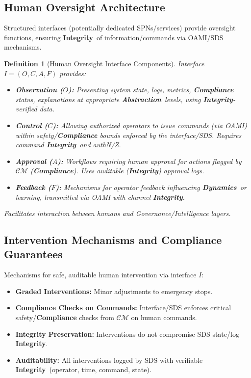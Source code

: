 \documentclass[12pt,a4paper]{report}
\newtheorem{definition}{Definition}[section]
\newcommand{\Integrity}{\textbf{Integrity}}
\newcommand{\Abstraction}{\textbf{Abstraction}}
\newcommand{\Dynamics}{\textbf{Dynamics}}
\begin{document}
	\subsection{Human Oversight Architecture} %
	\label{sec:5-7-1} %
	
	Structured interfaces (potentially dedicated SPNs/services) provide oversight functions, ensuring \Integrity\ of information/commands via OAMI/SDS mechanisms.
	
	\begin{definition}[Human Oversight Interface Components]
		\label{def:oversight-interface-compliance}
		Interface $I = (O, C, A, F)$ provides:
		\begin{itemize}[noitemsep]
			\item \textbf{Observation ($O$):} Presenting system state, logs, metrics, \textbf{Compliance} status, explanations at appropriate \Abstraction\ levels, using \Integrity-verified data.
			\item \textbf{Control ($C$):} Allowing authorized operators to issue commands (via OAMI) within safety/\textbf{Compliance} bounds enforced by the interface/SDS. Requires command \Integrity\ and authN/Z.
			\item \textbf{Approval ($A$):} Workflows requiring human approval for actions flagged by $\mathcal{CM}$ (\textbf{Compliance}). Uses auditable (\Integrity) approval logs.
			\item \textbf{Feedback ($F$):} Mechanisms for operator feedback influencing \Dynamics\ or learning, transmitted via OAMI with channel \Integrity.
		\end{itemize}
		Facilitates interaction between humans and Governance/Intelligence layers.
	\end{definition}
	
	\subsection{Intervention Mechanisms and Compliance Guarantees} %
	\label{sec:5-7-2} %
	
	Mechanisms for safe, auditable human intervention via interface $I$:
	\begin{itemize}
		\item \textbf{Graded Interventions:} Minor adjustments to emergency stops.
		\item \textbf{Compliance Checks on Commands:} Interface/SDS enforces critical safety/\textbf{Compliance} checks from $\mathcal{CM}$ on human commands.
		\item \textbf{Integrity Preservation:} Interventions do not compromise SDS state/log \Integrity.
		\item \textbf{Auditability:} All interventions logged by SDS with verifiable \Integrity\ (operator, time, command, state).
	\end{itemize}
	
\end{document}
